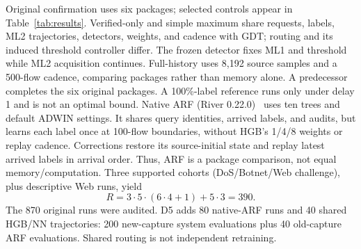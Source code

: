 \documentclass[conference]{IEEEtran}
\begin{document}
Original confirmation uses six packages; selected controls appear in Table~\ref{tab:results}. Verified-only and simple maximum share requests, labels, ML2 trajectories, detectors, weights, and cadence with GDT; routing and its induced threshold controller differ. The frozen detector fixes ML1 and threshold while ML2 acquisition continues. Full-history uses 8,192 source samples and a 500-flow cadence, comparing packages rather than memory alone. A predecessor completes the six original packages. A 100\%-label reference runs only under delay 1 and is not an optimal bound. Native ARF (River 0.22.0)~\cite{river} uses ten trees and default ADWIN settings. It shares query identities, arrived labels, and audits, but learns each label once at 100-flow boundaries, without HGB's 1/4/8 weights or replay cadence. Corrections restore its source-initial state and replay latest arrived labels in arrival order. Thus, ARF is a package comparison, not equal memory/computation. Three supported cohorts (DoS/Botnet/Web challenge), plus descriptive Web runs, yield
\begin{equation}
 R=3\cdot5\cdot(6\cdot4+1)+5\cdot3=390.\label{eq:runs}
\end{equation}
The 870 original runs were audited. D5 adds 80 native-ARF runs and 40 shared HGB/NN trajectories: 200 new-capture system evaluations plus 40 old-capture ARF evaluations. Shared routing is not independent retraining.
\end{document}
